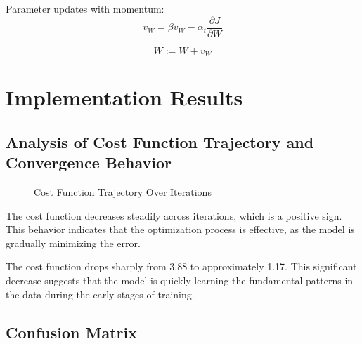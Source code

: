 \documentclass[times,final,english]{revdetua}
\begin{document}
Parameter updates with momentum:
\begin{equation}
v_W = \beta v_W - \alpha_t \frac{\partial J}{\partial W}
\end{equation}

\begin{equation}
W := W + v_W
\end{equation}

\section{Implementation Results}

\subsection{Analysis of Cost Function Trajectory and Convergence Behavior}

\begin{figure}[h!]
\centering
{}
\caption{Cost Function Trajectory Over Iterations}
\label{fig:cost_function_trajectory}
\end{figure}

The cost function decreases steadily across iterations, which is a positive sign. This behavior indicates that the optimization process is effective, as the model is gradually minimizing the error.

The cost function drops sharply from 3.88 to approximately 1.17. This significant decrease suggests that the model is quickly learning the fundamental patterns in the data during the early stages of training.

\subsection{Confusion Matrix}
\end{document}
